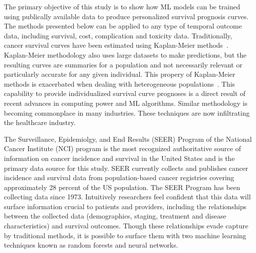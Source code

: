 \documentclass[10pt,letterpaper]{article}
\begin{document}
The primary objective of this study is to show how ML models can be trained using publically available data to produce personalized survival prognosis curves. The methods presented below can be applied to any type of temporal outcome data, including survival, cost, complication and toxicity data. Traditionally, cancer survival curves have been estimated using Kaplan-Meier methods~\cite{cam}. Kaplan-Meier methodology also uses large datasets to make predictions, but the resulting curves are summaries for a population and not necessarily relevant or particularly accurate for any given individual. This propery of Kaplan-Meier methods is exacerbated when dealing with heterogeneous populations~\cite{Kumbasar2016140}.  
This capability to provide individualized survival curve prognoses is a direct result of recent advances in computing power and ML algorithms. Similar methodology is becoming commonplace in many industries.
 These techniques are now infiltrating the healthcare industry.
 

The  Surveillance, Epidemiolgy, and End Results (SEER) Program of the National Cancer Institute (NCI) program is the most recognized authoritative source of information on cancer incidence and survival in the United States and is the primary data source for this study. SEER currently collects and publishes cancer incidence and survival data from population-based cancer registries covering approximately 28 percent of the US population.
The SEER Program  has been collecting data since 1973.
Intuitively 
researchers feel confident
 that this data will surface information crucial to patients and providers, including the relationships between the collected data (demographics, staging, treatment and disease characteristics) and survival outcomes.
Though these relationships evade capture by traditional methods, it is possible to surface them with two machine learning techniques known as random forests and neural networks.
\end{document}
